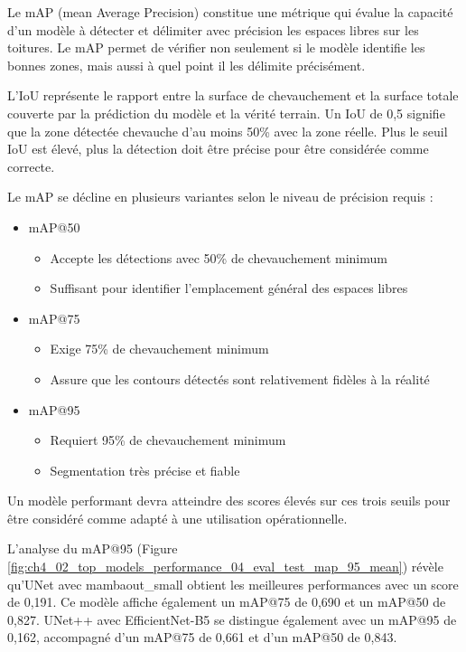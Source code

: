 Le mAP (mean Average Precision) constitue une métrique qui évalue la capacité d'un modèle à détecter et délimiter avec précision les espaces libres sur les toitures. Le mAP permet de vérifier non seulement si le modèle identifie les bonnes zones, mais aussi à quel point il les délimite précisément.

L'IoU représente le rapport entre la surface de chevauchement et la surface totale couverte par la prédiction du modèle et la vérité terrain. Un IoU de 0,5 signifie que la zone détectée chevauche d'au moins 50\% avec la zone réelle. Plus le seuil IoU est élevé, plus la détection doit être précise pour être considérée comme correcte.

Le mAP se décline en plusieurs variantes selon le niveau de précision requis :

\begin{itemize}
    \item mAP@50
    \begin{itemize}
        \item Accepte les détections avec 50\% de chevauchement minimum
        \item Suffisant pour identifier l'emplacement général des espaces libres
    \end{itemize}
    \item mAP@75
    \begin{itemize}
        \item Exige 75\% de chevauchement minimum
        \item Assure que les contours détectés sont relativement fidèles à la réalité
    \end{itemize}
    \item mAP@95
    \begin{itemize}
        \item Requiert 95\% de chevauchement minimum
        \item Segmentation très précise et fiable
    \end{itemize}
\end{itemize}

Un modèle performant devra atteindre des scores élevés sur ces trois seuils pour être considéré comme adapté à une utilisation opérationnelle.

L'analyse du mAP@95 (Figure \ref{fig:ch4_02_top_models_performance_04_eval_test_map_95_mean}) révèle qu'UNet avec mambaout\_small obtient les meilleures performances avec un score de 0,191. Ce modèle affiche également un mAP@75 de 0,690 et un mAP@50 de 0,827. UNet++ avec EfficientNet-B5 se distingue également avec un mAP@95 de 0,162, accompagné d'un mAP@75 de 0,661 et d'un mAP@50 de 0,843.

